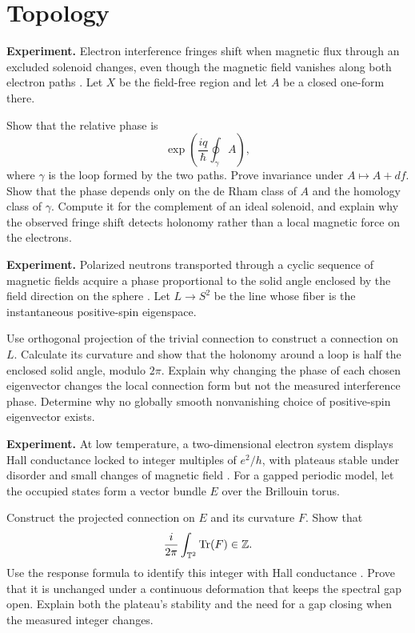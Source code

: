 \section{Topology}

\begin{exercise}
\textbf{Experiment.}
Electron interference fringes shift when magnetic flux through an excluded
solenoid changes, even though the magnetic field vanishes along both electron
paths \cite{aharonov-bohm,tonomura}.  Let \(X\) be the field-free region and
let \(A\) be a closed one-form there.

Show that the relative phase is
\[
        \exp\!\left(\frac{iq}{\hbar}\oint_\gamma A\right),
\]
where \(\gamma\) is the loop formed by the two paths.  Prove invariance under
\(A\mapsto A+df\).  Show that the phase depends only on the de Rham class of
\(A\) and the homology class of \(\gamma\).  Compute it for the complement of
an ideal solenoid, and explain why the observed fringe shift detects
holonomy rather than a local magnetic force on the electrons.
\end{exercise}

\begin{exercise}
\textbf{Experiment.}
Polarized neutrons transported through a cyclic sequence of magnetic fields
acquire a phase proportional to the solid angle enclosed by the field
direction on the sphere \cite{berry-neutron}.  Let \(L\to S^2\) be the line
whose fiber is the instantaneous positive-spin eigenspace.

Use orthogonal projection of the trivial connection to construct a connection
on \(L\).  Calculate its curvature and show that the holonomy around a loop is
half the enclosed solid angle, modulo \(2\pi\).  Explain why changing the phase
of each chosen eigenvector changes the local connection form but not the
measured interference phase.  Determine why no globally smooth nonvanishing
choice of positive-spin eigenvector exists.
\end{exercise}

\begin{exercise}
\textbf{Experiment.}
At low temperature, a two-dimensional electron system displays Hall
conductance locked to integer multiples of \(e^2/h\), with plateaus stable
under disorder and small changes of magnetic field \cite{von-klitzing}.
For a gapped periodic model, let the occupied states form a vector bundle
\(E\) over the Brillouin torus.

Construct the projected connection on \(E\) and its curvature \(F\).  Show
that
\[
        \frac{i}{2\pi}\int_{\mathbb T^2}\operatorname{Tr}(F)\in\mathbb Z.
\]
Use the response formula to identify this integer with Hall conductance
\cite{tknn}.  Prove that it is unchanged under a continuous deformation that
keeps the spectral gap open.  Explain both the plateau's stability and the
need for a gap closing when the measured integer changes.
\end{exercise}

